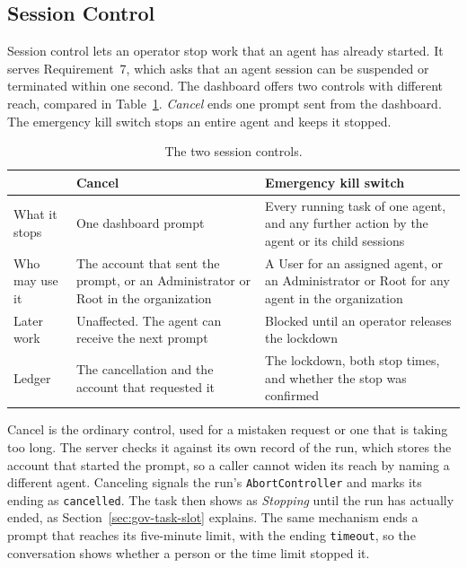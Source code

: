 \FloatBarrier
\subsection{Session Control}
\label{sec:gov-killswitch}

Session control lets an operator stop work that an agent has already
started. It serves Requirement~7, which asks that an agent session can be
suspended or terminated within one second. The dashboard offers two
controls with different reach, compared in
Table~\ref{tab:gov-session-controls}. \textit{Cancel} ends one prompt sent
from the dashboard. The emergency kill switch stops an entire agent and
keeps it stopped.

\begin{table}[htbp]
\centering
\caption{The two session controls.}
\label{tab:gov-session-controls}
\small
\begin{tabularx}{\textwidth}{@{}>{\raggedright\arraybackslash}p{}>{\raggedright\arraybackslash}X>{\raggedright\arraybackslash}X@{}}
\toprule
 & \textbf{Cancel} & \textbf{Emergency kill switch} \\
\midrule
What it stops & One dashboard prompt & Every running task of one agent,
and any further action by the agent or its child sessions \\
Who may use it & The account that sent the prompt, or an Administrator
or Root in the organization & A User for an assigned agent, or an
Administrator or Root for any agent in the organization \\
Later work & Unaffected. The agent can receive the next prompt & Blocked
until an operator releases the lockdown \\
Ledger & The cancellation and the account that requested it & The
lockdown, both stop times, and whether the stop was confirmed \\
\bottomrule
\end{tabularx}
\end{table}

Cancel is the ordinary control, used for a mistaken request or one that is
taking too long. The server checks it against its own record of the run,
which stores the account that started the prompt, so a caller cannot
widen its reach by naming a different agent. Canceling signals the run's
\texttt{AbortController} and marks its ending as \texttt{cancelled}. The
task then shows as \textit{Stopping} until the run has actually ended, as
Section~\ref{sec:gov-task-slot} explains. The same mechanism ends a prompt
that reaches its five-minute limit, with the ending \texttt{timeout}, so
the conversation shows whether a person or the time limit stopped it.

